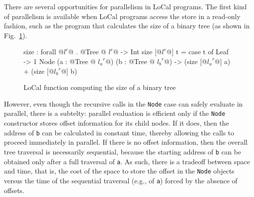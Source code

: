 \documentclass[showabstract,showacknowledgments,showpreface,showdedication,school]{iuphd}
\makeatletter
\theoremstyle{nonumberplain}
\newcommand{\sysname}[0]{LoCal\xspace}
\newcommand{\ourcalc}[0]{\sysname}
\newcommand{\locreg}[2]{\ensuremath{{#1}^{#2}}}
\newcommand{\tyatlocreg}[3]{#1 \ensuremath{@} \locreg{#2}{#3}}
\newcommand{\Figref}[1]{Fig.~\ref{#1}}
\newcommand{\il}[1]{\lstinline[style=inline,mathescape=true];#1;}
\makeatother
\begin{document}
There are several opportunities for parallelism in \ourcalc{} programs.
The first kind of parallelism is available when \ourcalc{} programs access
the store in a read-only fashion, such as the program that calculates
the size of a binary tree (as shown in \Figref{fig:sizefunc}).
\begin{figure}
\begin{code}
size : forall @\locreg{l}{r}@ . @\tyatlocreg{Tree}{l}{r}@ -> Int
size [@\locreg{l}{r}@] t = case t of
              Leaf -> 1
              Node (a : @\tyatlocreg{Tree}{l_a}{r}@) (b : @\tyatlocreg{Tree}{l_b}{r}@)
               -> (size [@\locreg{l_a}{r}@] a) + (size [@\locreg{l_b}{r}@] b)
\end{code}
\caption{\ourcalc{} function computing the size of a binary tree}\label{fig:sizefunc}
\end{figure}
However, even though the recursive calls in the \il{Node} case can
safely evaluate in parallel, there is a subtelty: parallel evaluation
is efficient only if the \il{Node} constructor stores offset
information for its child nodes.
If it does, then the address of \il{b} can be calculated in constant
time, thereby allowing the calls to proceed immediately in parallel.
If there is no offset information, then the overall tree traversal is
necessarily sequential, because the starting address of \il{b} can be
obtained only after a full traversal of \il{a}.
As such, there is a tradeoff between space and time, that is, the cost
of the space to store the offset in the \il{Node} objects versus the
time of the sequential traversal (e.g., of \il{a}) forced by the
absence of offsets.
\end{document}
